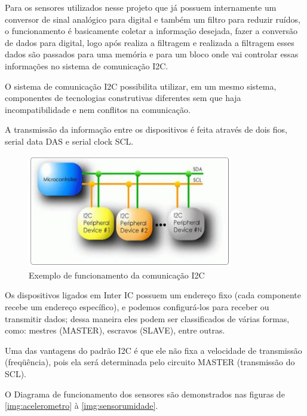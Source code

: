 Para os sensores utilizados nesse projeto que já possuem internamente um conversor de sinal analógico para digital e também um filtro para reduzir ruídos, o funcionamento é basicamente coletar a informação desejada, fazer a conversão de dados para digital, logo após realiza a filtragem e realizada a filtragem esses dados são passados para uma memória e para um bloco onde vai controlar essas informações no sistema de comunicação I2C.

O sistema de comunicação I2C possibilita utilizar, em um mesmo sistema, componentes de tecnologias construtivas diferentes sem que haja incompatibilidade e nem conflitos na comunicação.

A transmissão da informação entre os dispositivos é feita através de dois fios, serial data DAS e serial clock SCL.

\begin{figure}[H]
	\centering
	\includegraphics[width=0.8\textwidth]{figuras/1}
	\caption[Exemplo de funcionamento da comunicação I2C]{Exemplo de funcionamento da comunicação I2C~\cite{microcontrolandos}}
	\label{img:funcionamentoI2c}
\end{figure}

Os dispositivos ligados em Inter IC possuem um endereço fixo (cada componente recebe um endereço específico), e podemos configurá-los para receber ou transmitir dados; dessa maneira eles podem ser classificados de várias formas, como: mestres (MASTER), escravos (SLAVE), entre outras.

Uma das vantagens do padrão I2C é que ele não fixa a velocidade de transmissão (freqüência), pois ela será determinada pelo circuito MASTER (transmissão do SCL).

O Diagrama de funcionamento dos sensores são demonstrados nas figuras de \ref{img:acelerometro} à \ref{img:sensorumidade}.

